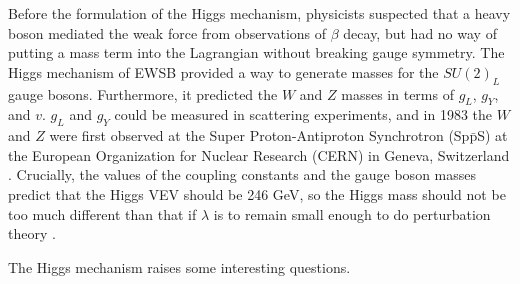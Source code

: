 \documentclass[dissertation.tex]{subfiles}
\begin{document}
Before the formulation of the Higgs mechanism, physicists suspected that a heavy boson mediated the weak force from observations of $\beta$ decay, but had no way of putting a mass term into the Lagrangian without breaking gauge symmetry.  The Higgs mechanism of EWSB provided a way to generate masses for the $SU(2)_{L}$ gauge bosons.  Furthermore, it predicted the $W$ and $Z$ masses in terms of $g_{L}$, $g_{Y}$, and $v$.  $g_{L}$ and $g_{Y}$ could be measured in scattering experiments, and in 1983 the $W$ and $Z$ were first observed at the Super Proton-Antiproton Synchrotron (Sp$\bar{\mbox{p}}$S) at the European Organization for Nuclear Research (CERN) in Geneva, Switzerland \cite{UA1_W, UA1_Z}.  Crucially, the values of the coupling constants and the gauge boson masses predict that the Higgs VEV should be 246 GeV, so the Higgs mass should not be too much different than that if $\lambda$ is to remain small enough to do perturbation theory \cite{Gunion}.

The Higgs mechanism raises some interesting questions.


\end{document}
